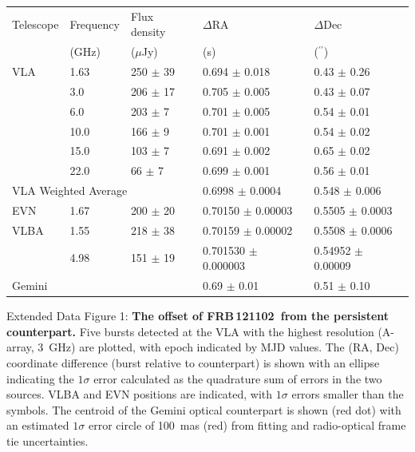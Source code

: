 \documentclass{nature_frb}
\newcommand{\frb}{FRB\,121102}
\newcommand{\arcsec}{\ensuremath{^{\prime\prime}}}
\begin{document}
\begin{table}
{\label{tab:vla-sed}}
\medskip
\begin{tabular}{lllll}
\hline
\hline
Telescope  & Frequency & Flux density & $\Delta$RA & $\Delta$Dec \\
           & (GHz)     & ($\mu$Jy)    & (s)        &  ($\arcsec$) \\[1mm]
\hline
\rule{0pt}{2ex} VLA       &  1.63 & 250 $\pm$ 39 & 0.694 $\pm$ 0.018 & 0.43 $\pm$ 0.26 \\
          &  3.0  & 206 $\pm$ 17 & 0.705 $\pm$ 0.005 & 0.43 $\pm$ 0.07 \\
          &  6.0  & 203 $\pm$  7 & 0.701 $\pm$ 0.005 & 0.54 $\pm$ 0.01 \\
          & 10.0  & 166 $\pm$  9 & 0.701 $\pm$ 0.001 & 0.54 $\pm$ 0.02 \\
          & 15.0  & 103 $\pm$  7 & 0.691 $\pm$ 0.002 & 0.65 $\pm$ 0.02 \\
          & 22.0  &  66 $\pm$  7 & 0.699 $\pm$ 0.001 & 0.56 $\pm$ 0.01 \\
\multicolumn{3}{l}{\rule{0pt}{2ex} VLA Weighted Average} & 0.6998 $\pm$ 0.0004 & 0.548 $\pm$ 0.006 \\[1mm]
\hline
\rule{0pt}{2ex} EVN       & 1.67  & 200 $\pm$ 20   & 0.70150 $\pm$  0.00003 & 0.5505 $\pm$ 0.0003 \\[1mm]
\hline
\rule{0pt}{2ex} VLBA    & 1.55  & 218 $\pm$ 38   & 0.70159  $\pm$  0.00002  & 0.5508 $\pm$ 0.0006 \\
        & 4.98  & 151 $\pm$ 19   & 0.701530 $\pm$  0.000003 & 0.54952 $\pm$ 0.00009\\[1mm]
\hline
\rule{0pt}{2ex} Gemini       &       &                & 0.69      $\pm$ 0.01      &  0.51 $\pm$ 0.10 \\
\hline
\hline
\end{tabular}
\end{table}


\clearpage
\bigskip\noindent
Extended Data Figure 1: {\bf The offset of \frb\ from the persistent counterpart.} Five bursts detected at the VLA with the highest resolution (A-array, 3~GHz) are plotted, with epoch indicated by MJD values. The (RA, Dec) coordinate difference (burst relative to counterpart) is shown with an ellipse indicating the $1\sigma$ error calculated as the quadrature sum of errors in the two sources. VLBA and EVN positions are indicated, with $1\sigma$ errors smaller than the symbols. The centroid of the Gemini optical counterpart is shown (red dot) with an estimated $1\sigma$ error circle of 100~mas (red) from fitting and radio-optical frame tie uncertainties.
\end{document}
